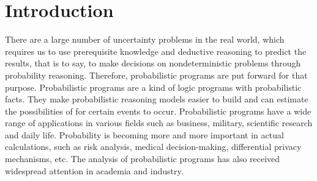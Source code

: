 \documentclass[sigconf,review, anonymous]{acmart}
\newcommand\leaveout[1]{}
\begin{document}
\leaveout{
%
%
\begin{CCSXML}
<ccs2012>
 <concept>
  <concept_id>10010520.10010553.10010562</concept_id>
  <concept_desc>Computer systems organization~Embedded systems</concept_desc>
  <concept_significance>500</concept_significance>
 </concept>
 <concept>
  <concept_id>10010520.10010575.10010755</concept_id>
  <concept_desc>Computer systems organization~Redundancy</concept_desc>
  <concept_significance>300</concept_significance>
 </concept>
 <concept>
  <concept_id>10010520.10010553.10010554</concept_id>
  <concept_desc>Computer systems organization~Robotics</concept_desc>
  <concept_significance>100</concept_significance>
 </concept>
 <concept>
  <concept_id>10003033.10003083.10003095</concept_id>
  <concept_desc>Networks~Network reliability</concept_desc>
  <concept_significance>100</concept_significance>
 </concept>
</ccs2012>  
\end{CCSXML}
}





\maketitle


\section{Introduction}
There are a large number of uncertainty problems in the real world, which requires us to use prerequisite knowledge and deductive reasoning to predict the results, that is to say, to make decisions on nondeterministic problems through probability reasoning. Therefore, probabilistic programs are put forward for that purpose. Probabilistic programs are a kind of logic programs with probabilistic facts. They make probabilistic reasoning models easier to build and can estimate the possibilities of for certain events to occur.
Probabilistic programs have a wide range of applications in various fields such as business, military, scientific research and daily life. Probability is becoming more and more important in actual calculations, such as risk analysis, medical decision-making, differential privacy mechanisms, etc. The analysis of probabilistic programs has also received widespread attention in academia and industry. %
\end{document}
